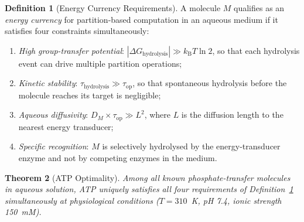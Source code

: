 \documentclass[11pt,twocolumn,a4paper]{article}
\newtheorem{theorem}{Theorem}[section]
\theoremstyle{definition}
\newtheorem{definition}[theorem]{Definition}
\theoremstyle{remark}
\newcommand{\kB}{k_{\mathrm{B}}}
\begin{document}
\begin{definition}[Energy Currency Requirements]
\label{def:currency_req}
A molecule $M$ qualifies as an \emph{energy currency} for partition-based
computation in an aqueous medium if it satisfies four constraints simultaneously:
\begin{enumerate}[nosep, label=(\roman*)]
\item \textit{High group-transfer potential}: $|\Delta G_{\mathrm{hydrolysis}}|
  \gg \kB T \ln 2$, so that each hydrolysis event can drive multiple
  partition operations;
\item \textit{Kinetic stability}: $\tau_{\mathrm{hydrolysis}} \gg \tau_{\mathrm{op}}$,
  so that spontaneous hydrolysis before the molecule reaches its target is negligible;
\item \textit{Aqueous diffusivity}: $D_M \times \tau_{\mathrm{op}} \gg L^2$,
  where $L$ is the diffusion length to the nearest energy transducer;
\item \textit{Specific recognition}: $M$ is selectively hydrolysed by the
  energy-transducer enzyme and not by competing enzymes in the medium.
\end{enumerate}
\end{definition}

\begin{theorem}[ATP Optimality]
\label{thm:atp}
Among all known phosphate-transfer molecules in aqueous solution, ATP uniquely
satisfies all four requirements of Definition~\ref{def:currency_req}
simultaneously at physiological conditions ($T = 310$~K, pH 7.4,
ionic strength 150~mM).
\end{theorem}
\end{document}

